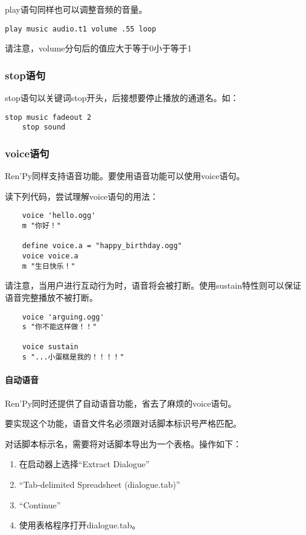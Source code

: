 play语句同样也可以调整音频的音量。
\begin{lstlisting}[numbers=none]
    play music audio.t1 volume .55 loop
\end{lstlisting}
请注意，volume分句后的值应大于等于0小于等于1

\subsubsection{stop语句}

stop语句以关键词stop开头，后接想要停止播放的通道名。如：
\begin{lstlisting}[]
    stop music fadeout 2
    stop sound
\end{lstlisting}

\subsubsection{voice语句}
Ren'Py同样支持语音功能。要使用语音功能可以使用voice语句。

读下列代码，尝试理解voice语句的用法：
\begin{lstlisting}
    voice 'hello.ogg'
    m "你好！"

    define voice.a = "happy_birthday.ogg"
    voice voice.a
    m "生日快乐！"
\end{lstlisting}

请注意，当用户进行互动行为时，语音将会被打断。使用sustain特性则可以保证语音完整播放不被打断。
\begin{lstlisting}
    voice 'arguing.ogg'
    s "你不能这样做！！"

    voice sustain
    s "...小蛋糕是我的！！！！"
\end{lstlisting}

\paragraph{自动语音}
Ren'Py同时还提供了自动语音功能，省去了麻烦的voice语句。

要实现这个功能，语音文件名必须跟对话脚本标识号严格匹配。

对话脚本标示名，需要将对话脚本导出为一个表格。操作如下：
\begin{enumerate}
    \item 在启动器上选择“Extract Dialogue”
    \item “Tab-delimited Spreadsheet (dialogue.tab)”
    \item “Continue”
    \item 使用表格程序打开dialogue.tab。
\end{enumerate}

